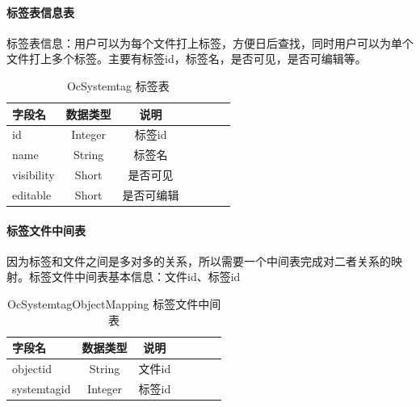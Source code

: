 \paragraph{标签表信息表}
标签表信息：用户可以为每个文件打上标签，方便日后查找，同时用户可以为单个文件打上多个标签。主要有标签id，标签名，是否可见，是否可编辑等。

\begin{table}[htbp]\center
\caption{OcSystemtag 标签表}
\begin{tabular}{lcccccl}
    \toprule
    字段名& 数据类型 & 说明 \\
    \midrule
id          & Integer & 标签id\\
name        & String  & 标签名\\
visibility  & Short   & 是否可见\\
editable    & Short   & 是否可编辑\\
    \bottomrule 
\end{tabular}
\label{tag_table}   
\end{table}

\paragraph{标签文件中间表}
因为标签和文件之间是多对多的关系，所以需要一个中间表完成对二者关系的映射。标签文件中间表基本信息：文件id、标签id
\begin{table}[htbp]\center
\caption{OcSystemtagObjectMapping 标签文件中间表}
\begin{tabular}{lcccccl}
    \toprule
    字段名& 数据类型 & 说明 \\
    \midrule
    objectid    &  String  & 文件id\\
    systemtagid &  Integer  & 标签id\\
    \bottomrule 
\end{tabular}
\label{middle_table}   
\end{table}
\newpage